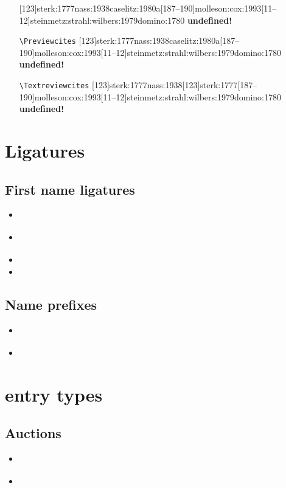 \documentclass[a4paper,12pt]{scrartcl}
\newcommand*{\Befehl}[1]{\texttt{\textbackslash#1}}
\begin{document}
\begin{enumerate}
        {[123]{sterk:1777}{nass:1938}{caselitz:1980a}[187--190]{molleson:cox:1993}[11--12]{steinmetz:strahl:wilbers:1979}{domino:1780}}
        {\textbf{undefined!}}%
	\item[\footnotesize\Befehl{Previewcites}] 
        {[123]{sterk:1777}{nass:1938}{caselitz:1980a}[187--190]{molleson:cox:1993}[11--12]{steinmetz:strahl:wilbers:1979}{domino:1780}}
        {\textbf{undefined!}}%
	\item[\footnotesize\Befehl{Textreviewcites}] 
        {[123]{sterk:1777}{nass:1938}[123]{sterk:1777}[187--190]{molleson:cox:1993}[11--12]{steinmetz:strahl:wilbers:1979}{domino:1780}}
        {\textbf{undefined!}}%
\end{enumerate}


\section{Ligatures}

\subsection{First name ligatures}
\begin{itemize}
    \item\cite{test::firstnames::2}%
    \item\cite{test::firstnames::1}%
    \item{}%
    \item{}%
\end{itemize}

\subsection{Name prefixes}
\begin{itemize}
    \item\cite{test::prefixnames::1}%
    \item{}%
\end{itemize}

\section{entry types}

\subsection{Auctions}
\begin{itemize}
    \item\cite{hesse:c:1995}%
    \item{}
\end{itemize}
\end{document}
